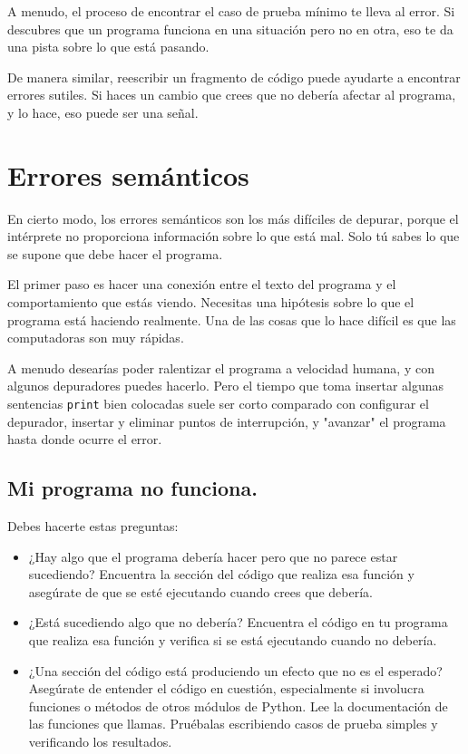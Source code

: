 A menudo, el proceso de encontrar el caso de prueba mínimo te lleva al error. Si descubres que un programa funciona en una situación pero no en otra, eso te da una pista sobre lo que está pasando.

De manera similar, reescribir un fragmento de código puede ayudarte a encontrar errores sutiles. Si haces un cambio que crees que no debería afectar al programa, y lo hace, eso puede ser una señal.

\section{Errores semánticos}

En cierto modo, los errores semánticos son los más difíciles de depurar, porque el intérprete no proporciona información sobre lo que está mal. Solo tú sabes lo que se supone que debe hacer el programa.

El primer paso es hacer una conexión entre el texto del programa y el comportamiento que estás viendo. Necesitas una hipótesis sobre lo que el programa está haciendo realmente. Una de las cosas que lo hace difícil es que las computadoras son muy rápidas.

A menudo desearías poder ralentizar el programa a velocidad humana, y con algunos depuradores puedes hacerlo. Pero el tiempo que toma insertar algunas sentencias \texttt{print} bien colocadas suele ser corto comparado con configurar el depurador, insertar y eliminar puntos de interrupción, y "avanzar" el programa hasta donde ocurre el error.

\subsection{Mi programa no funciona.}

Debes hacerte estas preguntas:

\begin{itemize}
    \item ¿Hay algo que el programa debería hacer pero que no parece estar sucediendo? Encuentra la sección del código que realiza esa función y asegúrate de que se esté ejecutando cuando crees que debería.
    \item ¿Está sucediendo algo que no debería? Encuentra el código en tu programa que realiza esa función y verifica si se está ejecutando cuando no debería.
    \item ¿Una sección del código está produciendo un efecto que no es el esperado? Asegúrate de entender el código en cuestión, especialmente si involucra funciones o métodos de otros módulos de Python. Lee la documentación de las funciones que llamas. Pruébalas escribiendo casos de prueba simples y verificando los resultados.
\end{itemize}

